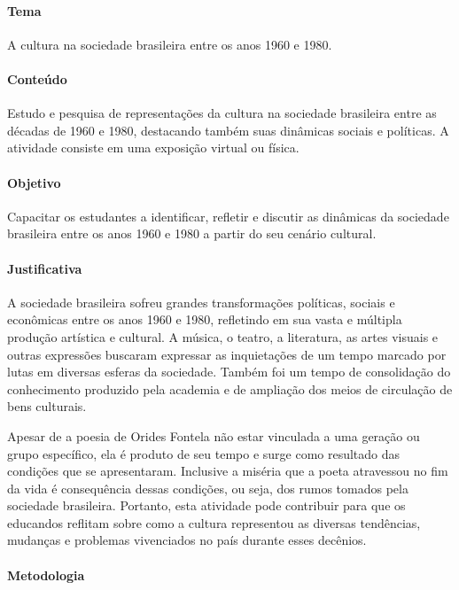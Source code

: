 \documentclass[12pt]{extarticle}
\begin{document}
\paragraph{Tema}{A cultura na sociedade brasileira entre os anos 1960 e 1980.}

\paragraph{Conteúdo} Estudo e pesquisa de representações da cultura na
sociedade brasileira entre as décadas de 1960 e 1980, destacando também
suas dinâmicas sociais e políticas. A atividade consiste em uma
exposição virtual ou física.

\paragraph{Objetivo} Capacitar os estudantes a identificar, refletir e
discutir as dinâmicas da sociedade brasileira entre os anos 1960 e 1980
a partir do seu cenário cultural.

\paragraph{Justificativa} A sociedade brasileira sofreu grandes
transformações políticas, sociais e econômicas entre os anos 1960 e
1980, refletindo em sua vasta e múltipla produção artística e cultural.
A música, o teatro, a literatura, as artes visuais e outras expressões
buscaram expressar as inquietações de um tempo marcado por lutas em
diversas esferas da sociedade. Também foi um tempo de consolidação do
conhecimento produzido pela academia e de ampliação dos meios de
circulação de bens culturais.

Apesar de a poesia de Orides Fontela não estar vinculada a uma geração
ou grupo específico, ela é produto de seu tempo e surge como resultado
das condições que se apresentaram. Inclusive a miséria que a poeta
atravessou no fim da vida é consequência dessas condições, ou seja, dos
rumos tomados pela sociedade brasileira. Portanto, esta atividade pode
contribuir para que os educandos reflitam sobre como a cultura
representou as diversas tendências, mudanças e problemas vivenciados no
país durante esses decênios.

\paragraph{Metodologia}
\end{document}
